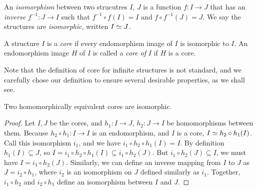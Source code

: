 \documentclass[acmsmall,screen,nonacm,review]{acmart}
\begin{document}
\begin{definition}
    An {\em isomorphism} between two strucutres $I$, $J$ 
    is a function $f: I \rightarrow J$ that 
    has an {\em inverse} $f^{-1}: J \rightarrow I$
    such that $f^{-1} \circ f (I)= I$ and $f \circ f^{-1} (J) = J$.
    We say the structures are {\em isomorphic}, written $I \simeq J$.
\end{definition}

\begin{definition}
    A structure $I$ is a {\em core} if every endomorphism image 
    of $I$ is isomorphic to $I$.
    An endomorphism image $H$ of $I$ is called a {\em core of} $I$
    if $H$ is a core.
\end{definition}

Note that the definition of core for infinite structures is not standard, 
 and we carefully chose our definition to ensure several desirable properties, 
 as we shall see.

\begin{lemma}\label{lem:core-iso}
    Two homomorphically equivalent cores are isomorphic.
\end{lemma}
\begin{proof}
    Let $I, J$ be the cores,
    and $h_1: I \rightarrow J$, $h_2: J \rightarrow I$ be 
    homomorphisms between them.
    Because $h_2 \circ h_1 : I \rightarrow I$ is an endomorphism, 
    and $I$ is a core, $I \simeq h_2 \circ h_1(I)$.
    Call this isomorphism $i_1$, and we have $i_1 \circ h_2 \circ h_1(I) = I$.
    By definition $h_1(I) \subseteq J$, 
    so $I = i_1 \circ h_2 \circ h_1(I) \subseteq i_1 \circ h_2(J)$.
    But $i_1 \circ h_2(J) \subseteq I$,
    we must have $I = i_1 \circ h_2(J)$.
    Similarly, we can define an inverse mapping from $I$ to $J$
    as $J = i_2 \circ h_1$, where $i_2$ is an isomorphism on 
    $J$ defined similarly as $i_1$.
    Together, $i_1 \circ h_2$ and $i_2 \circ h_1$ define an isomorphism 
    between $I$ and $J$.
\end{proof}
\end{document}
